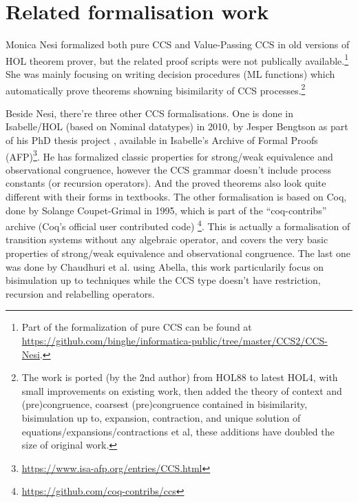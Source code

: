 \section{Related formalisation work}

Monica Nesi formalized both pure CCS \cite{Nesi:1992ve} and Value-Passing CCS
\cite{Nesi:2017wo} in old versions of HOL theorem prover, but the
related proof scripts were not publically available.\footnote{Part of
 the formalization of pure CCS can be found at \url{https://github.com/binghe/informatica-public/tree/master/CCS2/CCS-Nesi}.}
She was mainly focusing on writing decision procedures (ML functions) which
automatically prove theorems showning bisimilarity of CCS
processes.\footnote{The work is ported (by the 2nd author) from
HOL88 to latest HOL4, with small improvements on existing work, then
added the theory of context and (pre)congruence, coarsest
(pre)congruence contained in bisimilarity, bisimulation up to,
expansion, contraction, and unique solution of
equations/expansions/contractions et al, these additions have doubled
the size of original work.}

Beside Nesi, there're three other CCS formalisations. One
is done in Isabelle/HOL (based on Nominal datatypes) in 2010, by Jesper Bengtson as part of his PhD
thesis project \cite{bengtson2010formalising}, available in Isabelle's Archive of Formal
Proofs (AFP)\footnote{\url{https://www.isa-afp.org/entries/CCS.html}}. He has formalized
classic properties for strong/weak equivalence and observational
congruence, however the CCS grammar doesn't include process constants
(or recursion operators). And the proved theorems also look quite
different with their forms in textbooks.
The other formalisation is based on Coq, done by Solange
Coupet-Grimal in 1995, which is part of the
``coq-contribs'' archive (Coq's official user contributed code)
\footnote{\url{https://github.com/coq-contribs/ccs}}. This is actually
a formalisation of transition systems without any algebraic operator,
and covers the very basic properties of strong/weak equivalence and observational
congruence. The last one was done by Chaudhuri et
al.\cite{chaudhuri2014formalization} using Abella, this work
particularily focus on bisimulation up to techniques while the CCS
type doesn't have restriction, recursion and relabelling operators.

